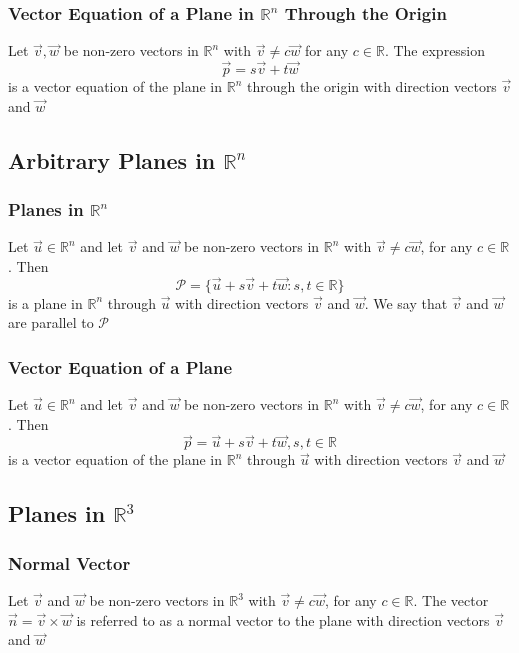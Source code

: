 \documentclass[12pt, letterpaper]{article}
\begin{document}
\subsubsection{Vector Equation of a Plane in $\mathbb{R}^n$ Through the Origin}
Let $\vec{v},\vec{w}$ be non-zero vectors in $\mathbb{R}^n$ with $\vec{v}\neq c\vec{w}$ for any $c\in\mathbb{R}$. The expression 
\[\vec{p} = s\vec{v}+t\vec{w}\]
is a vector equation of the plane in $\mathbb{R}^n$ through the origin with direction vectors $\vec{v}$ and $\vec{w}$
\subsection{Arbitrary Planes in $\mathbb{R}^n$}
\subsubsection{Planes in $\mathbb{R}^n$}
Let $\vec{u}\in\mathbb{R}^n$ and let $\vec{v}$ and $\vec{w}$ be non-zero vectors in $\mathbb{R}^n$ with 
$\vec{v}\neq c\vec{w}$, for any $c\in\mathbb{R}$. Then 
\[\mathcal{P} = \{\vec{u} + s\vec{v} + t\vec{w} : s,t\in\mathbb{R}\}\]
is a plane in $\mathbb{R}^n$ through $\vec{u}$ with direction vectors $\vec{v}$ and $\vec{w}$. We say that $\vec{v}$ and $\vec{w}$ are parallel to $\mathcal{P}$
\subsubsection{Vector Equation of a Plane}
Let $\vec{u}\in\mathbb{R}^n$ and let $\vec{v}$ and $\vec{w}$ be non-zero vectors in $\mathbb{R}^n$ with 
$\vec{v}\neq c\vec{w}$, for any $c\in\mathbb{R}$. Then 
\[\vec{p} = \vec{u}+s\vec{v}+t\vec{w}, s,t\in\mathbb{R}\]
is a vector equation of the plane in $\mathbb{R}^n$ through $\vec{u}$ with direction vectors $\vec{v}$ and $\vec{w}$
\subsection{Planes in $\mathbb{R}^3$}
\subsubsection{Normal Vector}
Let $\vec{v}$ and $\vec{w}$ be non-zero vectors in $\mathbb{R}^3$ with $\vec{v}\neq c\vec{w}$, for any 
$c\in\mathbb{R}$. The vector $\vec{n} = \vec{v}\times\vec{w}$ is referred to as a normal vector to the plane 
with direction vectors $\vec{v}$ and $\vec{w}$
\end{document}
